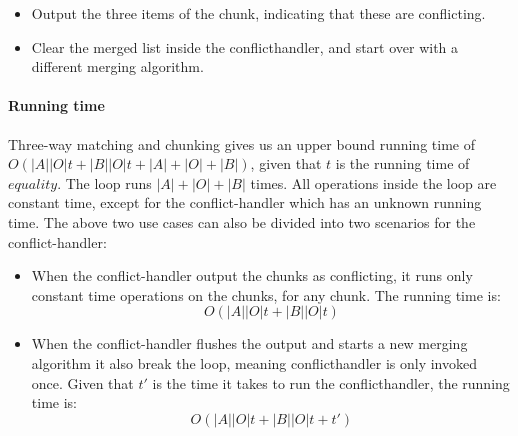 \documentclass[11pt]{article}
\begin{document}
\begin{itemize}
   \item Output the three items of the chunk, indicating that these are conflicting.
   \item Clear the merged list inside the conflicthandler, and start over with a different merging algorithm.
\end{itemize}

\paragraph{Running time} Three-way matching and chunking gives us an upper bound running time of $O(|A||O| t + |B||O| t + |A|+|O|+|B|)$, given that $t$ is the running time of $equality$. The loop runs $|A|+|O|+|B|$ times. All operations inside the loop are constant time, except for the conflict-handler which has an unknown running time. The above two use cases can also be divided into two scenarios for the conflict-handler:

\begin{itemize}
	\item When the conflict-handler output the chunks as conflicting, it runs only constant time operations on the chunks, for any chunk. The running time is:\\
		\begin{equation}
			O(|A||O| t + |B||O| t) \nonumber
		\end{equation}

	
	\item When the conflict-handler flushes the output and starts a new merging algorithm it also break the loop, meaning conflicthandler is only invoked once. Given that $t'$ is the time it takes to run the conflicthandler, the running time is:\\
		\begin{equation}
			O(|A||O| t + |B||O| t + t') \nonumber
		\end{equation}

\end{itemize}
\end{document}
